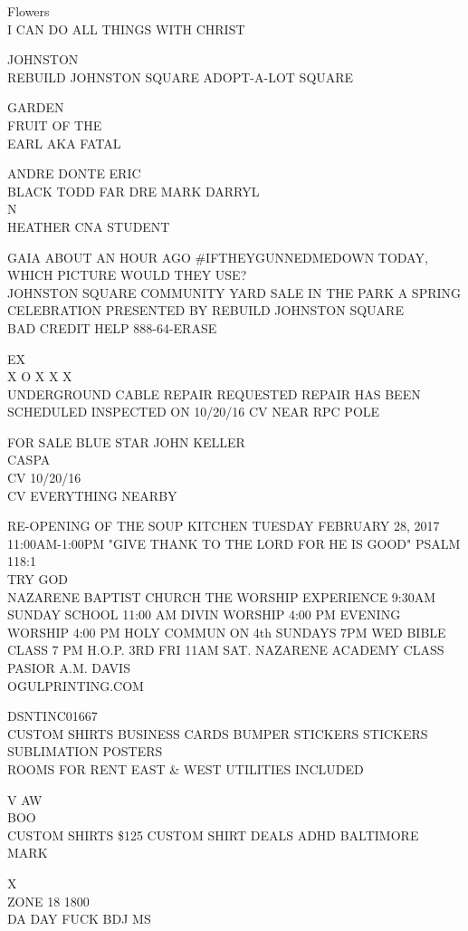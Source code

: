 \documentclass[10pt,letterpaper]{article}
\begin{document}
Flowers\\
I CAN DO ALL THINGS WITH CHRIST

JOHNSTON\\
REBUILD JOHNSTON SQUARE ADOPT{-}A{-}LOT SQUARE

GARDEN\\
FRUIT OF THE\\
EARL AKA FATAL

ANDRE DONTE ERIC\\
BLACK TODD FAR DRE MARK DARRYL\\
N\\
HEATHER CNA STUDENT

GAIA ABOUT AN HOUR AGO \#IFTHEYGUNNEDMEDOWN TODAY, WHICH PICTURE WOULD THEY USE?\\
JOHNSTON SQUARE COMMUNITY YARD SALE IN THE PARK A SPRING CELEBRATION PRESENTED BY REBUILD JOHNSTON SQUARE\\
BAD CREDIT HELP 888{-}64{-}ERASE

EX\\
X O X X X\\
UNDERGROUND CABLE REPAIR REQUESTED REPAIR HAS BEEN SCHEDULED INSPECTED ON 10/20/16 CV NEAR RPC POLE

FOR SALE BLUE STAR JOHN KELLER\\
CASPA\\
CV 10/20/16\\
CV EVERYTHING NEARBY

RE{-}OPENING OF THE SOUP KITCHEN TUESDAY FEBRUARY 28, 2017 11:00AM{-}1:00PM "GIVE THANK TO THE LORD FOR HE IS GOOD" PSALM 118:1\\
TRY GOD\\
NAZARENE BAPTIST CHURCH THE WORSHIP EXPERIENCE 9:30AM SUNDAY SCHOOL 11:00 AM DIVIN WORSHIP 4:00 PM EVENING WORSHIP 4:00 PM HOLY COMMUN ON 4th SUNDAYS 7PM WED BIBLE CLASS 7 PM H.O.P. 3RD FRI 11AM SAT. NAZARENE ACADEMY CLASS PASIOR A.M. DAVIS\\
OGULPRINTING.COM

DSNTINC01667\\
CUSTOM SHIRTS BUSINESS CARDS BUMPER STICKERS STICKERS SUBLIMATION POSTERS\\
ROOMS FOR RENT EAST \& WEST UTILITIES INCLUDED

V AW\\
BOO\\
CUSTOM SHIRTS \$125 CUSTOM SHIRT DEALS ADHD BALTIMORE\\
MARK

X\\
ZONE 18 1800\\
DA DAY FUCK BDJ MS
\end{document}
